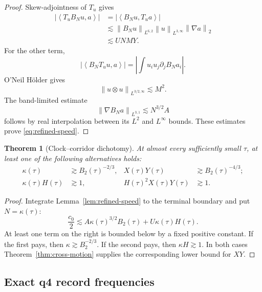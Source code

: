 \documentclass[11pt]{article}
\newtheorem{theorem}{Theorem}
\theoremstyle{remark}
\newcommand{\norm}[1]{\left\|#1\right\|}
\newcommand{\ip}[2]{\left\langle#1,#2\right\rangle}
\begin{document}
\begin{proof}
Skew-adjointness of \(T_u\) gives
\[
 \begin{aligned}
 |\ip{T_uB_Nu}{a}|
 &=
 |\ip{B_Nu}{T_ua}|\\
 &\lesssim
 \norm{B_Nu}_{L^{6,2}}
 \norm{u}_{L^{3,\infty}}
 \norm{\nabla a}_2\\
 &\lesssim
 UNMY.
 \end{aligned}
\]
For the other term,
\[
 |\ip{B_NT_uu}{a}|
 =
 \left|
 \int u_i u_j\partial_jB_Na_i
 \right|.
\]
O'Neil H\"older gives
\[
 \norm{u\otimes u}_{L^{3/2,\infty}}\lesssim M^2.
\]
The band-limited estimate
\[
 \norm{\nabla B_Na}_{L^{3,1}}
 \lesssim
 N^{3/2}A
\]
follows by real interpolation between its \(L^2\) and \(L^\infty\)
bounds.  These estimates prove \eqref{eq:refined-speed}.
\end{proof}

\begin{theorem}[Clock--corridor dichotomy]
\label{thm:corridor}
At almost every sufficiently small \(\tau\), at least one of the
following alternatives holds:
\begin{align}
\label{eq:clock-branch}
 \kappa(\tau)
 &\gtrsim
 B_2(\tau)^{-2/3},
 &
 X(\tau)Y(\tau)
 &\gtrsim
 B_2(\tau)^{-4/3};
 \tag{C}\\
\label{eq:corridor-branch}
 \kappa(\tau)H(\tau)
 &\gtrsim1,
 &
 H(\tau)^2X(\tau)Y(\tau)
 &\gtrsim1.
 \tag{R}
\end{align}
\end{theorem}

\begin{proof}
Integrate Lemma~\ref{lem:refined-speed} to the terminal boundary and
put \(N=\kappa(\tau)\):
\[
 \frac{c_0}{2}
 \lesssim
 A\kappa(\tau)^{3/2}B_2(\tau)
 +
 U\kappa(\tau)H(\tau).
\]
At least one term on the right is bounded below by a fixed positive
constant.  If the first pays, then
\(\kappa\gtrsim B_2^{-2/3}\).  If the second pays, then
\(\kappa H\gtrsim1\).  In both cases
Theorem~\ref{thm:cross-motion} supplies the corresponding lower bound
for \(XY\).
\end{proof}

\subsection{Exact q4 record frequencies}
\end{document}
